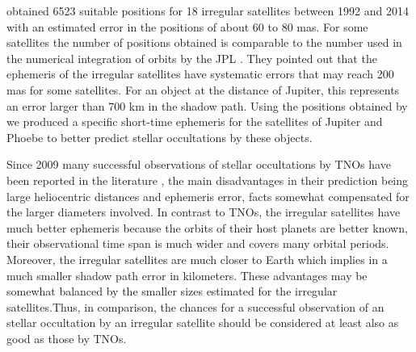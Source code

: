 
\cite{GomesJunior2015} obtained 6523 suitable positions for 18 irregular satellites between 1992 and 2014 with an estimated error in the positions of about 60 to 80 mas. For some satellites the number of positions obtained is comparable to the number used in the numerical integration of orbits by the JPL \citep{Jacobson2012}. They pointed out that the ephemeris of the irregular satellites have systematic errors that may reach 200 mas for some satellites. For an object at the distance of Jupiter, this represents an error larger than 700 km in the shadow path. Using the positions obtained by \cite{GomesJunior2015} we produced a specific short-time ephemeris for the satellites of Jupiter and Phoebe to better predict stellar occultations by these objects.

Since 2009 many successful observations of stellar occultations by TNOs have been reported in the literature \citep{Elliot2010, Sicardy2011, Ortiz2012, Braga-Ribas2013}, the main disadvantages in their prediction being large heliocentric distances and ephemeris error, facts somewhat compensated for the larger diameters involved. In contrast to TNOs, the irregular satellites have much better ephemeris because the orbits of their host planets are better  known, their observational time span is much wider and covers many orbital periods. Moreover, the irregular satellites are much closer to Earth which implies in a much smaller shadow path error in kilometers. These advantages may be somewhat balanced by the smaller sizes estimated for the irregular satellites.Thus, in comparison, the chances for a successful observation of an stellar occultation by an irregular satellite should be considered at least also as good as those by TNOs.

